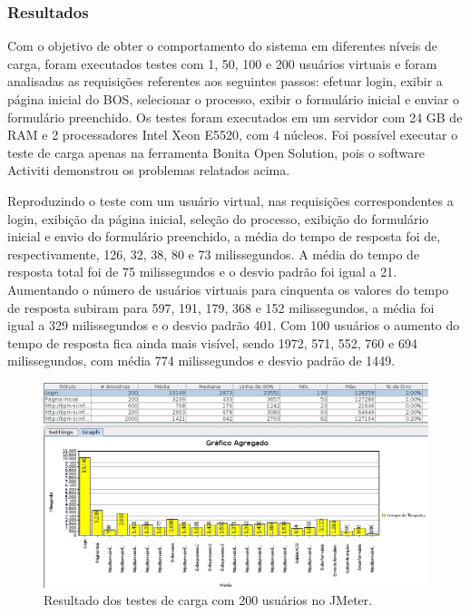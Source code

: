 \documentclass[12pt]{article}
\begin{document}


\subsubsection{Resultados}
Com o objetivo de obter o comportamento do sistema em diferentes níveis de carga, foram executados testes com 1, 50, 100 e 200 usuários virtuais e foram analisadas as requisições referentes aos seguintes passos: efetuar login, exibir a página inicial do BOS, selecionar o processo, exibir o formulário inicial e enviar o formulário preenchido. Os testes foram executados em um servidor com 24 GB de RAM e 2 processadores Intel Xeon E5520, com 4 núcleos. Foi possível executar o teste de carga apenas na ferramenta Bonita Open Solution, pois o software Activiti demonstrou os problemas relatados acima.

Reproduzindo o teste com um usuário virtual, nas requisições correspondentes a login, exibição da página inicial, seleção do processo, exibição do formulário inicial e envio do formulário preenchido, a média do tempo de resposta foi de, respectivamente, 126, 32, 38, 80 e 73 milissegundos. A média do tempo de resposta total foi de 75 milissegundos e o desvio padrão foi igual a 21.  Aumentando o número de usuários virtuais para cinquenta os valores do tempo de resposta subiram para 597, 191, 179, 368 e 152 milissegundos, a média foi igual a 329 milissegundos e o desvio padrão 401. Com 100 usuários o aumento do tempo de resposta fica ainda mais visível, sendo 1972, 571, 552, 760 e 694 milissegundos, com média 774 milissegundos e desvio padrão de 1449.

\begin{figure}[ht]
\centering
\includegraphics[width=.99\textwidth]{figuras/grafico200.jpg}
\caption{Resultado dos testes de carga com 200 usuários no JMeter.}
\label{fig:carga200}
\end{figure}
\end{document}
